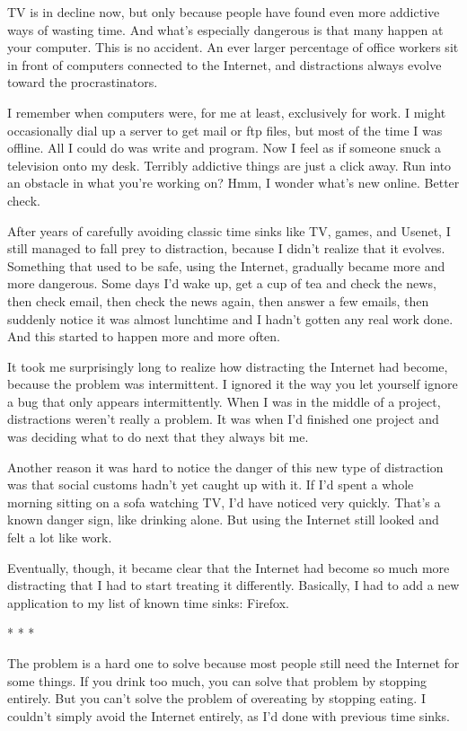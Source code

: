 \documentclass[12pt]{book}
\begin{document}
TV is in decline now, but only because people have found even more
addictive ways of wasting time. And what's especially dangerous is that
many happen at your computer. This is no accident. An ever larger
percentage of office workers sit in front of computers connected to the
Internet, and distractions always evolve toward the procrastinators.

I remember when computers were, for me at least, exclusively for work. I
might occasionally dial up a server to get mail or ftp files, but most
of the time I was offline. All I could do was write and program. Now I
feel as if someone snuck a television onto my desk. Terribly addictive
things are just a click away. Run into an obstacle in what you're
working on? Hmm, I wonder what's new online. Better check.

After years of carefully avoiding classic time sinks like TV, games, and
Usenet, I still managed to fall prey to distraction, because I didn't
realize that it evolves. Something that used to be safe, using the
Internet, gradually became more and more dangerous. Some days I'd wake
up, get a cup of tea and check the news, then check email, then check
the news again, then answer a few emails, then suddenly notice it was
almost lunchtime and I hadn't gotten any real work done. And this
started to happen more and more often.

It took me surprisingly long to realize how distracting the Internet had
become, because the problem was intermittent. I ignored it the way you
let yourself ignore a bug that only appears intermittently. When I was
in the middle of a project, distractions weren't really a problem. It
was when I'd finished one project and was deciding what to do next that
they always bit me.

Another reason it was hard to notice the danger of this new type of
distraction was that social customs hadn't yet caught up with it. If I'd
spent a whole morning sitting on a sofa watching TV, I'd have noticed
very quickly. That's a known danger sign, like drinking alone. But using
the Internet still looked and felt a lot like work.

Eventually, though, it became clear that the Internet had become so much
more distracting that I had to start treating it differently. Basically,
I had to add a new application to my list of known time sinks: Firefox.

* * *

The problem is a hard one to solve because most people still need the
Internet for some things. If you drink too much, you can solve that
problem by stopping entirely. But you can't solve the problem of
overeating by stopping eating. I couldn't simply avoid the Internet
entirely, as I'd done with previous time sinks.
\end{document}
